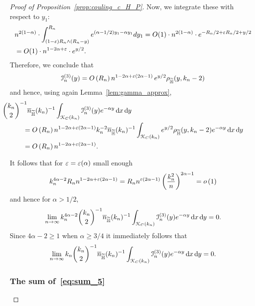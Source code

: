 \begin{proof}[Proof of Proposition~\ref{prop:couling_c_H_P}]
Now, we integrate these with respect to $y_1$:
\begin{align}
	&n^{2(1-\alpha)} \cdot \int_{(1-\varepsilon) R_n \wedge (R_n-y)}^{R_n} e^{(\alpha -1/2)y_1 - \alpha y_1} dy_1 
		=O(1) \cdot n^{2(1-\alpha)} \cdot e^{-R_n/2 + \varepsilon R_n/2  + y/2}  \\
	&= O(1) \cdot n^{1-2\alpha + \varepsilon} \cdot e^{y/2}.
\end{align}
Therefore, we conclude that
\[
	\mathcal{I}_n^{(3)}(y) = O\left(R_n\right) n^{1-2\alpha +\varepsilon(2\alpha -1)} \, e^{y/2} \rho_{\widetilde{\mathbb{H}}}(y,k_n-2)
\]
and hence, using again Lemma~\ref{lem:gamma_approx},
\begin{align*}
	&\hspace{-30pt}\binom{k_n}{2}^{-1} \expH^{-1} \int_{\Kcal_{C}(k_n)} \mathcal{I}_n^{(3)}(y) e^{-\alpha y} \dd x \dd y\\
	&= \bigO{R_n} n^{1-2\alpha +\eps(2\alpha -1)} k_n^{-2} \expH^{-1} \int_{\Kcal_{C}(k_n)} e^{y/2} 
		\rho_{\HP}(y,k_n-2) e^{-\alpha y} \dd x \dd y\\
	&= \bigO{R_n} n^{1-2\alpha +\eps(2\alpha -1)}.
\end{align*}

It follows that for $\varepsilon = \varepsilon(\alpha)$ small enough
\[
	k_n^{4\alpha - 2} R_n n^{1-2\alpha +\varepsilon(2\alpha -1)}
	= R_n n^{\varepsilon(2\alpha -1)} \left(\frac{k_n^2}{n}\right)^{2\alpha - 1} = o\left(1\right)
\]
and hence for $\alpha > 1/2$,
\[
	\lim_{n \to \infty} k_n^{4\alpha - 2} \binom{k_n}{2}^{-1} \overline{n}_{\widetilde{\mathbb{H}}}(k_n)^{-1} \int_{{\mathcal K}_{C}(k_n)} \mathcal{I}_n^{(3)}(y) e^{-\alpha y} \operatorname{\mathrm{d}\hspace{-2pt}} x \operatorname{\mathrm{d}\hspace{-2pt}} y = 0.
\]
Since $4\alpha - 2 \ge 1$ when $\alpha \ge 3/4$ it immediately follows that
\[
	\lim_{n \to \infty} k_n \binom{k_n}{2}^{-1} \overline{n}_{\widetilde{\mathbb{H}}}(k_n)^{-1} \int_{{\mathcal K}_{C}(k_n)} \mathcal{I}_n^{(3)}(y) e^{-\alpha y} \operatorname{\mathrm{d}\hspace{-2pt}} x \operatorname{\mathrm{d}\hspace{-2pt}} y = 0.
\]


\subsubsection*{The sum of~\eqref{eq:sum_5}}


\end{proof}
